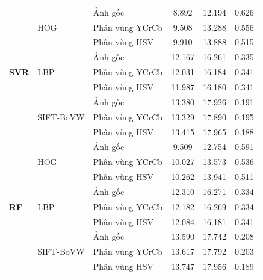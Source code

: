 \begin{table}[H]
\begin{tabular}{lllccc}
        \multirow{9}{*}{\textbf{SVR}} 
        & \multirow{3}{*}{HOG} 
        & Ảnh gốc & 8.892 & 12.194 & 0.626 \\
        & & Phân vùng YCrCb & 9.508 & 13.288 & 0.556 \\
        & & Phân vùng HSV & 9.910 & 13.888 & 0.515 \\
        \cmidrule{2-6}
        & \multirow{3}{*}{LBP} 
        & Ảnh gốc & 12.167 & 16.261 & 0.335 \\
        & & Phân vùng YCrCb & 12.031 & 16.184 & 0.341 \\
        & & Phân vùng HSV & 11.987 & 16.180 & 0.341 \\
        \cmidrule{2-6}
        & \multirow{3}{*}{SIFT-BoVW} 
        & Ảnh gốc & 13.380 & 17.926 & 0.191 \\
        & & Phân vùng YCrCb & 13.329 & 17.890 & 0.195 \\
        & & Phân vùng HSV & 13.415 & 17.965 & 0.188 \\
        \midrule
        
        \multirow{9}{*}{\textbf{RF}} 
        & \multirow{3}{*}{HOG} 
        & Ảnh gốc & 9.509 & 12.754 & 0.591 \\
        & & Phân vùng YCrCb & 10.027 & 13.573 & 0.536 \\
        & & Phân vùng HSV & 10.262 & 13.941 & 0.511 \\
        \cmidrule{2-6}
        & \multirow{3}{*}{LBP} 
        & Ảnh gốc & 12.310 & 16.271 & 0.334 \\
        & & Phân vùng YCrCb & 12.182 & 16.269 & 0.334 \\
        & & Phân vùng HSV & 12.084 & 16.181 & 0.341 \\
        \cmidrule{2-6}
        & \multirow{3}{*}{SIFT-BoVW} 
        & Ảnh gốc & 13.590 & 17.742 & 0.208 \\
        & & Phân vùng YCrCb & 13.617 & 17.792 & 0.203 \\
        & & Phân vùng HSV & 13.747 & 17.956 & 0.189 \\
        \bottomrule
    \end{tabular}
\end{table}

